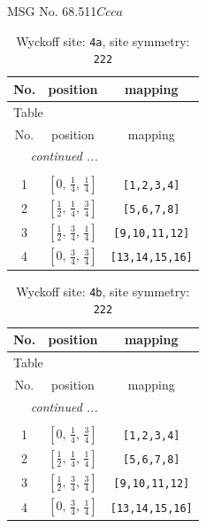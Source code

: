 \documentclass[fleqn,8pt]{jsarticle}
\begin{document}
\setcounter{MaxMatrixCols}{32}

\renewcommand{\tablename}{Table~}
\renewcommand{\figurename}{Figure~}
\begin{center}
\LARGE
MSG No. 68.511\quad$Ccca$
\end{center}
\renewcommand{\arraystretch}{1.2}
\begin{longtable}{ccc}
\caption{Wyckoff site: {\tt 4a}, site symmetry: {\tt 222}}
 \\
 \hline \hline
No. & position & mapping \\ \hline \endfirsthead

\multicolumn{2}{l}{\tablename\ \thetable{}} \\
 \hline \hline
No. & position & mapping \\ \hline \endhead

 \hline \hline
\multicolumn{2}{r}{\footnotesize\it continued ...} \\ \endfoot

 \hline \hline
\multicolumn{2}{r}{} \\ \endlastfoot

1 & $\left[ 0,\, \frac{1}{4},\, \frac{1}{4} \right]$ & {\tt [1,2,3,4]} \\ \hline
2 & $\left[ \frac{1}{2},\, \frac{1}{4},\, \frac{3}{4} \right]$ & {\tt [5,6,7,8]} \\ \hline
3 & $\left[ \frac{1}{2},\, \frac{3}{4},\, \frac{1}{4} \right]$ & {\tt [9,10,11,12]} \\ \hline
4 & $\left[ 0,\, \frac{3}{4},\, \frac{3}{4} \right]$ & {\tt [13,14,15,16]} \\
\end{longtable}
\renewcommand{\arraystretch}{1.2}
\begin{longtable}{ccc}
\caption{Wyckoff site: {\tt 4b}, site symmetry: {\tt 222}}
 \\
 \hline \hline
No. & position & mapping \\ \hline \endfirsthead

\multicolumn{2}{l}{\tablename\ \thetable{}} \\
 \hline \hline
No. & position & mapping \\ \hline \endhead

 \hline \hline
\multicolumn{2}{r}{\footnotesize\it continued ...} \\ \endfoot

 \hline \hline
\multicolumn{2}{r}{} \\ \endlastfoot

1 & $\left[ 0,\, \frac{1}{4},\, \frac{3}{4} \right]$ & {\tt [1,2,3,4]} \\ \hline
2 & $\left[ \frac{1}{2},\, \frac{1}{4},\, \frac{1}{4} \right]$ & {\tt [5,6,7,8]} \\ \hline
3 & $\left[ \frac{1}{2},\, \frac{3}{4},\, \frac{3}{4} \right]$ & {\tt [9,10,11,12]} \\ \hline
4 & $\left[ 0,\, \frac{3}{4},\, \frac{1}{4} \right]$ & {\tt [13,14,15,16]} \\
\end{longtable}
\end{document}
